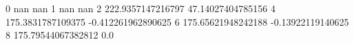 0 nan nan
1 nan nan
2 222.9357147216797 47.14027404785156
4 175.3831787109375 -0.412261962890625
6 175.65621948242188 -0.13922119140625
8 175.79544067382812 0.0
